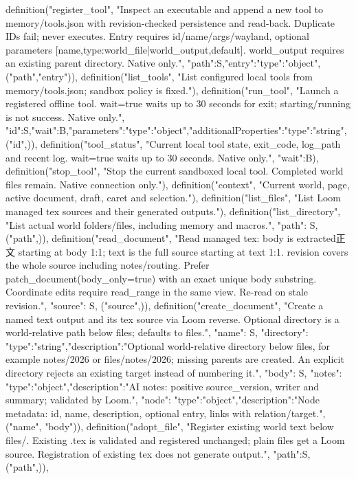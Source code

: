     definition("register_tool", "Inspect an executable and append a new tool to memory/tools.json with revision-checked persistence and read-back. Duplicate IDs fail; never executes. Entry requires id/name/args/wayland, optional parameters [{name,type:world_file|world_output,default}]. world_output requires an existing parent directory. Native only.", {"path":S,"entry":{"type":"object"}}, ("path","entry")),
    definition("list_tools", "List configured local tools from memory/tools.json; sandbox policy is fixed."),
    definition("run_tool", "Launch a registered offline tool. wait=true waits up to 30 seconds for exit; starting/running is not success. Native only.", {"id":S,"wait":B,"parameters":{"type":"object","additionalProperties":{"type":"string"}}}, ("id",)),
    definition("tool_status", "Current local tool state, exit_code, log_path and recent log. wait=true waits up to 30 seconds. Native only.", {"wait":B}),
    definition("stop_tool", "Stop the current sandboxed local tool. Completed world files remain. Native connection only."),
    definition("context", "Current world, page, active document, draft, caret and selection."),
    definition("list_files", "List Loom managed tex sources and their generated outputs."),
    definition("list_directory", "List actual world folders/files, including memory and macros.", {"path": S}, ("path",)),
    definition("read_document", "Read managed tex: body is extracted正文 starting at body 1:1; text is the full source starting at text 1:1. revision covers the whole source including notes/routing. Prefer patch_document(body_only=true) with an exact unique body substring. Coordinate edits require read_range in the same view. Re-read on stale revision.", {"source": S}, ("source",)),
    definition("create_document", "Create a named text output and its tex source via Loom reverse. Optional directory is a world-relative path below files; defaults to files.", {"name": S, "directory": {"type":"string","description":"Optional world-relative directory below files, for example notes/2026 or files/notes/2026; missing parents are created. An explicit directory rejects an existing target instead of numbering it."}, "body": S, "notes": {"type":"object","description":"AI notes: positive source_version, writer and summary; validated by Loom."}, "node": {"type":"object","description":"Node metadata: id, name, description, optional entry, links with relation/target."}}, ("name", "body")),
    definition("adopt_file", "Register existing world text below files/. Existing .tex is validated and registered unchanged; plain files get a Loom source. Registration of existing tex does not generate output.", {"path":S}, ("path",)),
